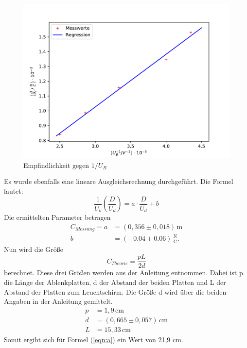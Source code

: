 \begin{figure}[H]
\centering
\includegraphics[width=\textwidth]{empfvsu.pdf}
\caption{Empfindlichkeit gegen $1/U_B$}
\label{fig:empfvsu}
\end{figure}
Es wurde ebenfalls eine lineare Ausgleichsrechnung durchgeführt.
Die Formel lautet:
\begin{equation*}
  \frac{1}{U_b}\left(\frac{D}{U_d}\right) = a \cdot \frac{D}{U_d} +b
\end{equation*}
Die ermittelten Parameter betragen
\begin{align*}
  C_{Messung} = a &= (0,356\pm 0,018)\, \mathrm{m}\\
  b  &= (-0.04\pm 0.06)\, \mathrm{\frac{N}{C}}.
\end{align*}
Nun wird die Größe
\begin{equation}
  C_{Theorie} = \frac{pL}{2d}
  \label{eqn:a}
\end{equation}
berechnet.
Diese drei Größen werden aus der Anleitung entnommen.
Dabei ist p die Länge der Ablenkplatten, d der Abstand der beiden Platten und L der Abstand der Platten zum Leuchtschirm.
Die Größe d wird über die beiden Angaben in der Anleitung gemittelt.
\begin{align}
  p &= 1,9\, \mathrm{cm} \\
  d &= (0,665 \pm 0,057)\, \mathrm{cm} \\
  L &= 15,33 \, \mathrm{cm}
  \label{eqn:L}
\end{align}
Somit ergibt sich für Formel (\ref{eqn:a}) ein Wert von 21,9 cm.\\


